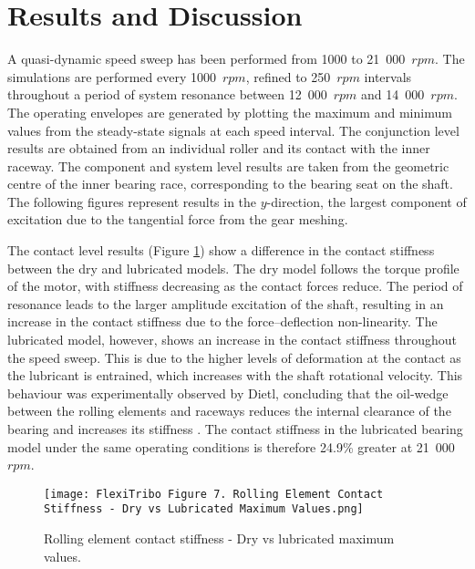 \section{Results and Discussion}

A quasi-dynamic speed sweep has been performed from 1000 to 21~000~$rpm$. The simulations are performed every 1000~$rpm$, refined to 250~$rpm$ intervals throughout a period of system resonance between 12~000~$rpm$ and 14~000~$rpm$. The operating envelopes are generated by plotting the maximum and minimum values from the steady-state signals at each speed interval. The conjunction level results are obtained from an individual roller and its contact with the inner raceway. The component and system level results are taken from the geometric centre of the inner bearing race, corresponding to the bearing seat on the shaft. The following figures represent results in the $y$-direction, the largest component of excitation due to the tangential force from the gear meshing.

The contact level results (Figure \ref{Rolling element contact stiffness - Dry vs lubricated maximum values}) show a difference in the contact stiffness between the dry and lubricated models. The dry model follows the torque profile of the motor, with stiffness decreasing as the contact forces reduce. The period of resonance leads to the larger amplitude excitation of the shaft, resulting in an increase in the contact stiffness due to the force–deflection non-linearity. The lubricated model, however, shows an increase in the contact stiffness throughout the speed sweep. This is due to the higher levels of deformation at the contact as the lubricant is entrained, which increases with the shaft rotational velocity. This behaviour was experimentally observed by Dietl, concluding that the oil-wedge between the rolling elements and raceways reduces the internal clearance of the bearing and increases its stiffness \cite{Dietl1997}. The contact stiffness in the lubricated bearing model under the same operating conditions is therefore 24.9\% greater at 21~000~$rpm$.

\begin{figure}  
	\texttt{[image: FlexiTribo Figure 7. Rolling Element Contact Stiffness - Dry vs Lubricated Maximum Values.png]}
	\caption{Rolling element contact stiffness - Dry vs lubricated maximum values.}
	\label{Rolling element contact stiffness - Dry vs lubricated maximum values}
\end{figure} 

